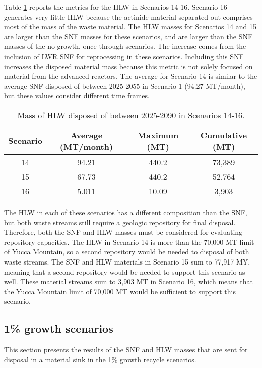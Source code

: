 Table \ref{tab:s14-16_hlw} reports the metrics for the \gls{HLW} 
in Scenarios 14-16. Scenario 16 generates very little 
\gls{HLW} because the actinide material separated out 
comprises most of the mass of the waste material. The \gls{HLW} 
masses for Scenarios 14 and 15 are larger than the \gls{SNF} 
masses for these scenarios, and are larger than the \gls{SNF} 
masses of the no growth, once-through scenarios. The increase 
comes from the inclusion of \gls{LWR} \gls{SNF} for reprocessing 
in these scenarios. Including this \gls{SNF} increases the 
disposed material mass because this metric is not solely focused 
on material from the advanced reactors. The average for 
Scenario 14 is similar to the average \gls{SNF} disposed of 
between 2025-2055 in Scenario 1 (94.27 MT/month), but these 
values consider different time frames. 

\begin{table}[h!]
    \centering 
    \caption{Mass of HLW disposed of between 2025-2090 in 
    Scenarios 14-16.}
    \label{tab:s14-16_hlw}
    \begin{tabular}{c c c c}
        \hline 
        Scenario & Average (MT/month) & Maximum (MT) & Cumulative (MT) \\
        \hline
        14 & 94.21 & 440.2 & 73,389\\
        15 & 67.73 & 440.2 & 52,764\\
        16 & 5.011 & 10.09 & 3,903\\
        \hline
    \end{tabular}
\end{table}

The \gls{HLW} in each of these scenarios has a different 
composition than the \gls{SNF}, but both waste streams 
still require a geologic repository for final 
disposal. Therefore, both the \gls{SNF} and \gls{HLW} 
masses must be considered for evaluating repository 
capacities. The \gls{HLW} in Scenario 14 is more than 
the 70,000 MT limit of Yucca Mountain, so a second 
repository would be needed to disposal of both waste 
streams. The \gls{SNF} and \gls{HLW} materials in 
Scenario 15 sum to 77,917 MY, meaning that a second 
repository would be needed to support this scenario 
as well. These material streams sum to 3,903 MT in 
Scenario 16, which means that the Yucca Mountain 
limit of 70,000 MT would be sufficient to support this 
scenario. 


\subsection{1\% growth scenarios}
This section presents the results of the \gls{SNF} and 
\gls{HLW} masses that are sent for disposal in a 
material sink in the 1\% growth recycle scenarios. 

